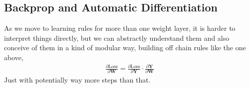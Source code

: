 \subsection{Backprop and Automatic Differentiation}

As we move to learning rules for more than one weight layer, it is harder to interpret things directly, but we can abstractly understand them and also conceive of them in a kind of modular way, building off chain rules like the one above, 
\begin{eqnarray}
\frac{\partial \text{Loss}}{\partial \mathbf{W}} = \frac{\partial \text{Loss}}{\partial \mathbf{Y}} \cdot \frac{\partial \mathbf{Y}}{\partial \mathbf{W}}
\end{eqnarray}
Just with potentially way more steps than that.
